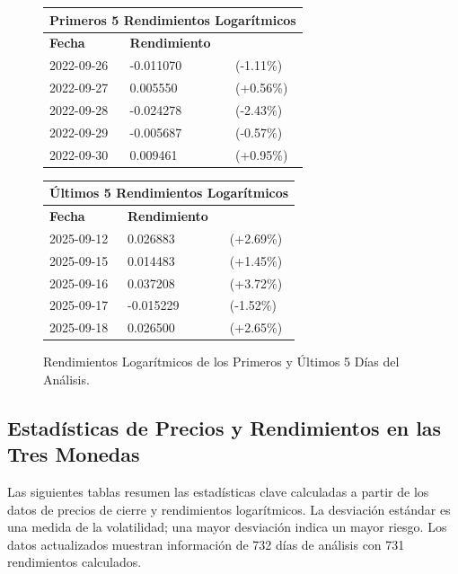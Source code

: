 \documentclass[12pt, a4paper]{article}
\begin{document}
\begin{figure}[H]
    \centering
    \begin{tabularx}{\textwidth}{@{}lll@{}}
        \toprule
        \multicolumn{3}{l}{\textbf{Primeros 5 Rendimientos Logarítmicos}} \\
        \midrule
        \textbf{Fecha} & \textbf{Rendimiento} & \\
        \midrule
        2022-09-26 & -0.011070 & (-1.11\%) \\
        2022-09-27 & 0.005550 & (+0.56\%) \\
        2022-09-28 & -0.024278 & (-2.43\%) \\
        2022-09-29 & -0.005687 & (-0.57\%) \\
        2022-09-30 & 0.009461 & (+0.95\%) \\
        \bottomrule
    \end{tabularx}
    \par\vspace{1em}
    \begin{tabularx}{\textwidth}{@{}lll@{}}
        \toprule
        \multicolumn{3}{l}{\textbf{Últimos 5 Rendimientos Logarítmicos}} \\
        \midrule
        \textbf{Fecha} & \textbf{Rendimiento} & \\
        \midrule
        2025-09-12 & 0.026883 & (+2.69\%) \\
        2025-09-15 & 0.014483 & (+1.45\%) \\
        2025-09-16 & 0.037208 & (+3.72\%) \\
        2025-09-17 & -0.015229 & (-1.52\%) \\
        2025-09-18 & 0.026500 & (+2.65\%) \\
        \bottomrule
    \end{tabularx}
    \caption{Rendimientos Logarítmicos de los Primeros y Últimos 5 Días del Análisis.}
    \label{tab:rendimientos}
\end{figure}

\newpage
\subsection*{Estadísticas de Precios y Rendimientos en las Tres Monedas}
Las siguientes tablas resumen las estadísticas clave calculadas a partir de los datos de precios de cierre y rendimientos logarítmicos. La desviación estándar es una medida de la volatilidad; una mayor desviación indica un mayor riesgo. Los datos actualizados muestran información de 732 días de análisis con 731 rendimientos calculados.
\end{document}
